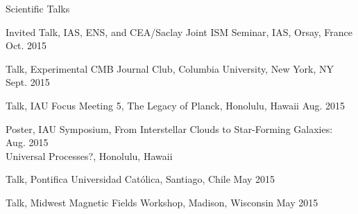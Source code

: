 \documentclass{resume_clark} %
\newcommand{\hi}{H{\sc i}~}
\begin{document}
\begin{rSection}{Scientific Talks}
\begin{etaremune}[itemsep=-1.8mm]
\item Invited Talk, IAS, ENS, and CEA/Saclay Joint ISM Seminar, IAS, Orsay, France \hfill {Oct. 2015}

\item Talk, Experimental CMB Journal Club, Columbia University, New York, NY \hfill {Sept. 2015}

\item Talk, IAU Focus Meeting 5, The Legacy of Planck, Honolulu, Hawaii \hfill {Aug. 2015}

\item Poster, IAU Symposium, From Interstellar Clouds to Star-Forming Galaxies: \hfill {Aug. 2015}\\Universal Processes?, Honolulu, Hawaii

\item Talk, Pontifica Universidad Cat\'olica, Santiago, Chile \hfill {May 2015}

\item Talk, Midwest Magnetic Fields Workshop, Madison, Wisconsin \hfill {May 2015}


\end{etaremune}
\end{rSection}
\end{document}
